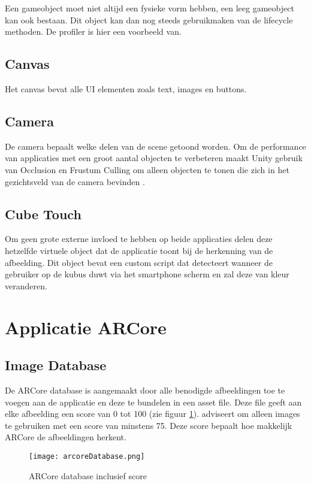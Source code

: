 Een gameobject moet niet altijd een fysieke vorm hebben, een leeg gameobject kan ook bestaan. Dit object kan dan nog steeds gebruikmaken van de lifecycle methoden. De profiler is hier een voorbeeld van.

\subsection{Canvas}
Het canvas bevat alle UI elementen zoals text, images en buttons.

\subsection{Camera}
De camera bepaalt welke delen van de scene getoond worden. Om de performance van applicaties met een groot aantal objecten te verbeteren maakt Unity gebruik van Occlusion en Frustum Culling om alleen objecten te tonen die zich in het gezichtsveld van de camera bevinden \autocite{UnityCulling}.

\subsection{Cube Touch}
Om geen grote externe invloed te hebben op beide applicaties delen deze hetzelfde virtuele object dat de applicatie toont bij de herkenning van de afbeelding. Dit object bevat een custom script dat detecteert wanneer de gebruiker op de kubus duwt via het smartphone scherm en zal deze van kleur veranderen.

\section{Applicatie ARCore}

\subsection{Image Database}
De ARCore database is aangemaakt door alle benodigde afbeeldingen toe te voegen aan de applicatie en deze te bundelen in een asset file. Deze file geeft aan elke afbeelding een score van 0 tot 100 (zie figuur \ref{fig:arcoreDatabase}). \textcite{GoogleImages} adviseert om alleen images te gebruiken met een score van minstens 75. Deze score bepaalt hoe makkelijk ARCore de afbeeldingen herkent.

\begin{figure}
    \texttt{[image: arcoreDatabase.png]}
    \caption{ARCore database inclusief score}
    \label{fig:arcoreDatabase}
\end{figure}

